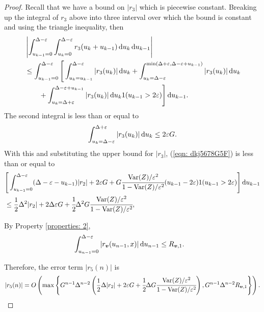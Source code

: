 \begin{proof}
	Recall that we have a bound on \(|r_3|\) which is piecewise constant. Breaking up the integral of \(r_3\) above into three interval over which the bound is constant and using the triangle inequality, then
	\begin{align}
		 \nonumber &\left|\int_{u_{k-1}=0}^{\Delta-\varepsilon}\int_{u_k=0}^{\Delta-\varepsilon}r_3(u_{k}+u_{k-1}) \, \mathrm{d} u_k \, \mathrm{d} u_{k-1} \right|
		\\\nonumber & \leq \int_{u_{k-1}=0}^{\Delta-\varepsilon}\Bigg[ \int_{u_k=u_{k-1}}^{\Delta-\varepsilon} | r_3(u_k) |\, \mathrm{d} u_k + \int_{u_k=\Delta-\varepsilon}^{\min(\Delta+\varepsilon,\Delta-\varepsilon+u_{k-1})} |r_3(u_k)|\, \mathrm{d} u_k 
		\\&\qquad{}+ \int_{u_k = \Delta+\varepsilon}^{\Delta-\varepsilon+u_{k-1}} |r_3(u_{k})|\, \mathrm{d} u_k1(u_{k-1}>2\varepsilon)\Bigg] \, \mathrm{d} u_{k-1}.\label{eqn: dkj5678G5F}
	\end{align}
	The second integral is less than or equal to 
	\[\int_{u_k=\Delta-\varepsilon}^{\Delta+\varepsilon} |r_3(u_k)|\, \mathrm{d} u_k \leq 2\varepsilon G. \]
	With this and substituting the upper bound for \(|r_3|\), (\ref{eqn: dkj5678G5F}) is less than or equal to
	\begin{align*}
		&\Bigg[\int_{u_{k-1}=0}^{\Delta-\varepsilon} (\Delta-\varepsilon-u_{k-1})|r_2 |+ 2\varepsilon G 
		+ G\cfrac{\mathrm{Var}(Z)/\varepsilon^2}{1-\mathrm{Var}(Z)/\varepsilon^2}(u_{k-1}-2\varepsilon)1(u_{k-1}>2\varepsilon) \Bigg]\, \mathrm{d} u_{k-1}
		\\& \leq \frac{1}{2}\Delta^2|r_2 |+ 2\Delta\varepsilon G 
		+ \cfrac{1}{2}\Delta^2G\cfrac{\mathrm{Var}(Z)/\varepsilon^2}{1-\mathrm{Var}(Z)/\varepsilon^2},
	\end{align*}
	
	By Property \ref{properties: 2}, 
	\begin{align*}
		&\int_{u_{n-1}=0}^{\Delta-\varepsilon}| r_{\boldsymbol v}(u_{n-1},x)|\, \mathrm{d} u_{n-1} 
		\leq R_{{\boldsymbol v},1}.
	\end{align*}

	Therefore, the error term \(|r_5(n)|\) is 
	\begin{align*}
		|r_5(n)|= O\left(\max\left\{G^{n-1}\Delta^{n-2}\left(\frac{1}{2}\Delta|r_2 |+ 2\varepsilon G 
		+ \cfrac{1}{2}\Delta G\cfrac{\mathrm{Var}(Z)/\varepsilon^2}{1-\mathrm{Var}(Z)/\varepsilon^2}\right),
		G^{n-1}\Delta^{n-2}R_{{\boldsymbol v},1}\right\}\right).
	\end{align*}
	

\end{proof}
